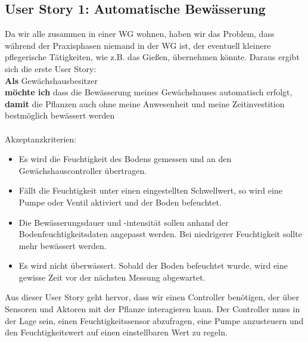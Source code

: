 \subsection{User Story 1: Automatische Bewässerung}
Da wir alle zusammen in einer WG wohnen, haben wir das Problem, dass während der Praxisphasen niemand in der WG ist, der eventuell kleinere pflegerische Tätigkeiten, wie z.B. das Gießen, übernehmen könnte. Daraus ergibt sich die erste User Story:
\\
\textbf{Als} Gewächshausbesitzer \\
\textbf{möchte ich} dass die Bewässerung meines Gewächshauses automatisch erfolgt, \\
\textbf{damit} die Pflanzen auch ohne meine Anwesenheit und meine Zeitinvestition bestmöglich bewässert werden
\\ \\
Akzeptanzkriterien: 
\begin{itemize}
    \item Es wird die Feuchtigkeit des Bodens gemessen und an den Gewächshauscontroller übertragen.
    \item Fällt die Feuchtigkeit unter einen eingestellten Schwellwert, so wird eine Pumpe oder Ventil aktiviert und der Boden befeuchtet.
    \item Die Bewässerungsdauer und -intensität sollen anhand der Bodenfeuchtigkeitsdaten angepasst werden. Bei niedrigerer Feuchtigkeit sollte mehr bewässert werden.
    \item Es wird nicht überwässert. Sobald der Boden befeuchtet wurde, wird eine gewisse Zeit vor der nächsten Messung abgewartet.
\end{itemize}
Aus dieser User Story geht hervor, dass wir einen Controller benötigen, der über Sensoren und Aktoren mit der Pflanze interagieren kann. Der Controller muss in der Lage sein, einen Feuchtigkeitssensor abzufragen, eine Pumpe anzusteuern und den Feuchtigkeitswert auf einen einstellbaren Wert zu regeln.

